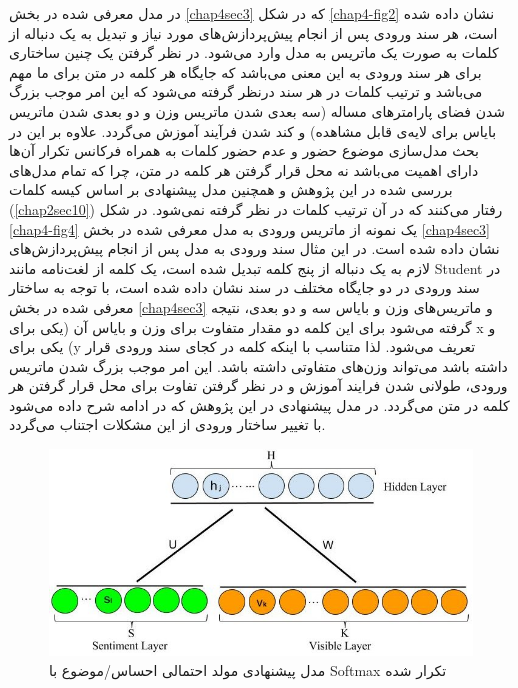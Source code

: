 در مدل معرفی‌ شده در بخش
\ref{chap4sec3}
که در شکل
\ref{chap4-fig2}
نشان داده شده است، هر سند ورودی پس از انجام پیش‌پردازش‌های مورد نیاز و تبدیل به یک دنباله از کلمات به صورت یک ماتریس به مدل وارد می‌‌شود. در نظر گرفتن یک چنین ساختاری برای هر سند ورودی به این معنی‌ می‌‌باشد که جایگاه هر کلمه در متن برای ما مهم می‌‌باشد و ترتیب کلمات در هر سند درنظر گرفته می‌‌شود که این امر موجب بزرگ شدن فضای پارامتر‌های مساله (سه‌ بعدی شدن ماتریس وزن و دو بعدی شدن ماتریس بایاس برای لایه‌ی قابل مشاهده) و کند شدن فرآیند آموزش می‌‌گردد. علاوه بر این در بحث مدل‌سازی موضوع حضور و عدم حضور کلمات به همراه فرکانس تکرار آن‌ها دارای اهمیت می‌‌باشد نه محل قرار گرفتن هر کلمه در متن، چرا که تمام مدل‌های بررسی‌ شده در این پژوهش و همچنین مدل پیشنهادی بر اساس کیسه کلمات
(\ref{chap2sec10})
رفتار می‌‌کنند که در آن ترتیب کلمات در نظر گرفته نمی‌‌شود.  در شکل
\ref{chap4-fig4}
یک نمونه از ماتریس ورودی به مدل معرفی‌ شده در بخش
\ref{chap4sec3}
نشان داده شده است. در این مثال سند ورودی به مدل پس از انجام پیش‌پردازش‌های لازم به یک دنباله از پنج کلمه تبدیل شده است، یک کلمه از لغت‌نامه  مانند 
Student
در سند ورودی در دو جایگاه مختلف در سند نشان داده شده است، با توجه به ساختار معرفی‌ شده در بخش
\ref{chap4sec3}
و ماتریس‌های وزن و بایاس سه‌ و دو بعدی، نتیجه گرفته می‌‌شود برای این کلمه دو مقدار متفاوت برای وزن و بایاس آن (یکی برای x
 و یکی برای 
 (y
 تعریف می‌‌شود. لذا متناسب با اینکه کلمه در کجای سند ورودی قرار داشته باشد می‌تواند وزن‌های متفاوتی داشته باشد. این امر موجب بزرگ شدن ماتریس ورودی،  طولانی‌ شدن فرایند آموزش و در نظر گرفتن تفاوت برای محل قرار گرفتن هر کلمه در متن می‌گردد. در مدل پیشنهادی در این پژوهش که در ادامه شرح داده می‌‌شود با تغییر ساختار ورودی از این مشکلات اجتناب می‌‌گردد.

\begin{figure}[!t]
	\centering
	\includegraphics[scale=0.5]{chap4-img/SRS}
	\caption{مدل پیشنهادی مولد احتمالی احساس/موضوع با Softmax تکرار شده}
	\label{chap4-fig3}
\end{figure}

